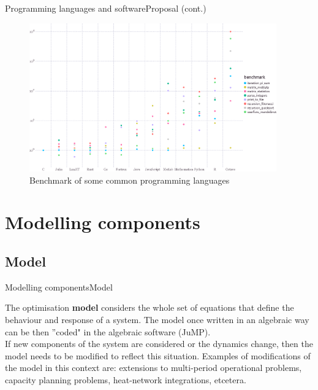 \documentclass[handout]{beamer}
\begin{document}
\begin{frame}[t]{Programming languages and software}{Proposal (cont.)}
  \begin{figure}
  \begin{center}
  \includegraphics[width=0.95\textwidth]{benchmarks.eps}
  \end{center}
  \caption{Benchmark of some common programming languages}\label{fig:speed}
  \end{figure}

\end{frame}

\section{Modelling components}

\subsection{Model}
\begin{frame}[t]{Modelling components}{Model}

  The optimisation \textbf{model} considers the whole set of equations that define the behaviour and response of a system. The model once written in an algebraic way can be then ''coded" in the algebraic software (JuMP).\\[6pt]

  If new components of the system are considered or the dynamics change, then the model needs to be modified to reflect this situation. Examples of modifications of the model in this context are: extensions to multi-period operational problems, capacity planning problems, heat-network integrations, etcetera.
\end{frame}
\end{document}
